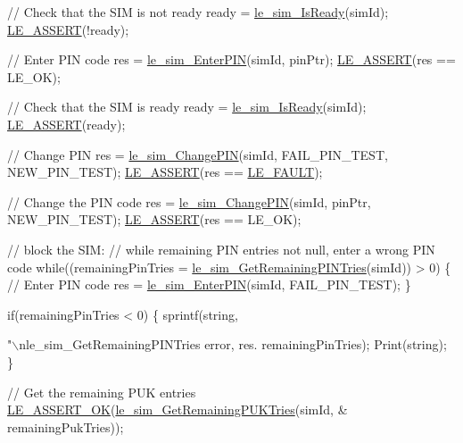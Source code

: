 \begin{DoxyCodeInclude}
    \textcolor{comment}{// Check that the SIM is not ready}
    ready = \hyperlink{le__sim__interface_8h_ace457890856d3692ecb4176f0e892558}{le\_sim\_IsReady}(simId);
    \hyperlink{le__log_8h_ac0dbbef91dc0fed449d0092ff0557b39}{LE\_ASSERT}(!ready);

    \textcolor{comment}{// Enter PIN code}
    res = \hyperlink{le__sim__interface_8h_ac9cafacb5affb0b531534e3fc547ebd2}{le\_sim\_EnterPIN}(simId, pinPtr);
    \hyperlink{le__log_8h_ac0dbbef91dc0fed449d0092ff0557b39}{LE\_ASSERT}(res == LE\_OK);

    \textcolor{comment}{// Check that the SIM is ready}
    ready = \hyperlink{le__sim__interface_8h_ace457890856d3692ecb4176f0e892558}{le\_sim\_IsReady}(simId);
    \hyperlink{le__log_8h_ac0dbbef91dc0fed449d0092ff0557b39}{LE\_ASSERT}(ready);

    \textcolor{comment}{// Change PIN}
    res = \hyperlink{le__sim__interface_8h_a50b6ce8bae5a073307d1d12550b22c1e}{le\_sim\_ChangePIN}(simId, FAIL\_PIN\_TEST, NEW\_PIN\_TEST);
    \hyperlink{le__log_8h_ac0dbbef91dc0fed449d0092ff0557b39}{LE\_ASSERT}(res == \hyperlink{le__basics_8h_a1cca095ed6ebab24b57a636382a6c86cac409634423b6b1ef09643529f6224798}{LE\_FAULT});

    \textcolor{comment}{// Change the PIN code}
    res = \hyperlink{le__sim__interface_8h_a50b6ce8bae5a073307d1d12550b22c1e}{le\_sim\_ChangePIN}(simId, pinPtr, NEW\_PIN\_TEST);
    \hyperlink{le__log_8h_ac0dbbef91dc0fed449d0092ff0557b39}{LE\_ASSERT}(res == LE\_OK);

    \textcolor{comment}{// block the SIM:}
    \textcolor{comment}{// while remaining PIN entries not null, enter a wrong PIN code}
    \textcolor{keywordflow}{while}((remainingPinTries = \hyperlink{le__sim__interface_8h_a8886dbb94aa732883ec5a67ddd345f98}{le\_sim\_GetRemainingPINTries}(simId)) > 0)
    \{
        \textcolor{comment}{// Enter PIN code}
        res = \hyperlink{le__sim__interface_8h_ac9cafacb5affb0b531534e3fc547ebd2}{le\_sim\_EnterPIN}(simId, FAIL\_PIN\_TEST);
    \}

    \textcolor{keywordflow}{if}(remainingPinTries < 0)
    \{
        sprintf(\textcolor{keywordtype}{string}, \textcolor{stringliteral}{"\(\backslash\)nle\_sim\_GetRemainingPINTries error, res.%
                remainingPinTries);
        Print(\textcolor{keywordtype}{string});
    \}

    \textcolor{comment}{// Get the remaining PUK entries}
    \hyperlink{le__log_8h_a7cd2daa3d4af1de4d29e0eed95187484}{LE\_ASSERT\_OK}(\hyperlink{le__sim__interface_8h_a285eeaa3c5e1977abbe49682145f3d35}{le\_sim\_GetRemainingPUKTries}(simId, &
      remainingPukTries));

}
\end{DoxyCodeInclude}
